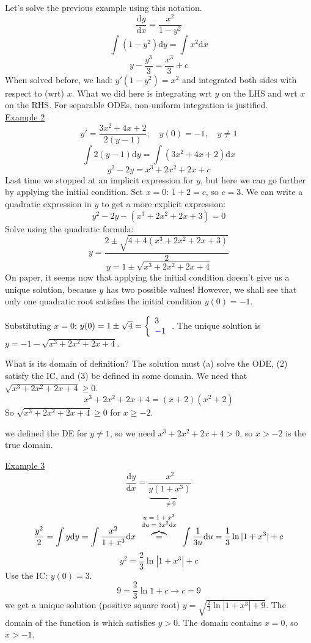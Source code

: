 \documentclass{article}
\newcommand{\mathd}{\mathrm{d}}
\newcommand{\nosymbol}{}
\newcommand{\tmcolor}[2]{{\color{#1}{#2}}}
\newcommand{\tmscript}[1]{\text{\scriptsize{$#1$}}}
\newcommand{\tmtextbf}[1]{\text{{\bfseries{#1}}}}
\begin{document}
Let's solve the previous example using this notation.
\[ \frac{\mathd y}{\mathd x} = \frac{x^2}{1 - y^2} \]
\[ \int (1 - y^2) \mathd y = \int x^2 \mathd x \]
\[ y - \frac{y^3}{3} = \frac{x^3}{3} + c \]
When solved before, we had: $y' (1 - y^2) = x^2$ and integrated both sides
with respect to (wrt) $x$. What we did here is integrating wrt $y$ on the LHS
and wrt $x$ on the RHS. For separable ODEs, non-uniform integration is
justified.
\[ \  \]
{\underline{Example 2}}
\[ y' = \frac{3 x^2 + 4 x + 2}{2 (y - 1)} ; \quad y (0) = - 1, \quad y \neq 1
\]
\[ \int 2 (y - 1) \mathd y = \int (3 x^2 + 4 x + 2) \mathd x \]
\[ y^2 - 2 y = x^3 + 2 x^2 + 2 x + c \]
Last time we stopped at an implicit expression for $y$, but here we can go
further by applying the initial condition. Set $x = 0$: $1 + 2 = c$, so $c =
3$. We can write a quadratic expression in $y$ to get a more explicit
expression:
\[ y^2 - 2 y - (x^3 + 2 x^2 + 2 x + 3) = 0 \]
Solve using the quadratic formula:
\[ y = \frac{2 \pm \sqrt{4 + 4 (x^3 + 2 x^2 + 2 x + 3)}}{2} \]
\[ y = 1 \pm \sqrt{x^3 + 2 x^2 + 2 x + 4} \]
On paper, it seems now that applying the initial condition doesn't give us a
unique solution, because $y$ has two possible values! However, we shall see
that only one quadratic root satisfies the initial condition $y (0) = - 1$.

Substituting $x = 0$: $y (0) = 1 \pm \sqrt{4} = \left\{\begin{array}{l}
  3\\
  \tmcolor{blue}{- 1}
\end{array}\right.$. The unique solution is {$y = - 1 - \sqrt{x^3 + 2 x^2 + 2
x + 4} {}$}.

What is its domain of definition? The solution must (a) solve the ODE, (2)
satisfy the IC, and (3) be defined in some domain. We need that $\sqrt{x^3 + 2
x^2 + 2 x + 4} \geq 0$.
\[ x^3 + 2 x^2 + 2 x + 4 = (x + 2) (x^2 + 2) \]
So $\sqrt{x^3 + 2 x^2 + 2 x + 4} \geq 0$ for $x \geq - 2$.

\tmtextbf{But,} we defined the DE for $y \neq 1$, so we need $x^3 + 2 x^2 + 2
x + 4 > 0$, so $x > - 2$ is the true domain.

{\underline{Example 3}}
\[ \frac{\mathd y}{\mathd x} = \frac{x^2}{\underbrace{y (1 +
   x^3)_{\nosymbol}}_{\neq 0}} \]
\[ \frac{y^2}{2} = \int y \mathd y = \int \frac{x^2}{1 + x^3} \mathd x
   \overbrace{=}^{\tmscript{\begin{array}{c}
     u = 1 + x^3\\
     \mathd u = 3 x^2 \mathd x
   \end{array}}} \int \frac{1}{3 u} \mathd u = \frac{1}{3} \ln | 1 + x^3 | + c
\]
\[ y^2 = \frac{2}{3} \ln | 1 + x^3 | + c \]
Use the IC: $y (0) = 3$.
\[ 9 = \frac{2}{3} \ln 1 + c \rightarrow c = 9 \]
we get a unique solution (positive square root) $y = \sqrt{\frac{2}{3} \ln | 1
+ x^3 | + 9}$. The domain of the function is which satisfies $y > 0$. The
domain contains $x = 0$, so $x > - 1$.
\end{document}
